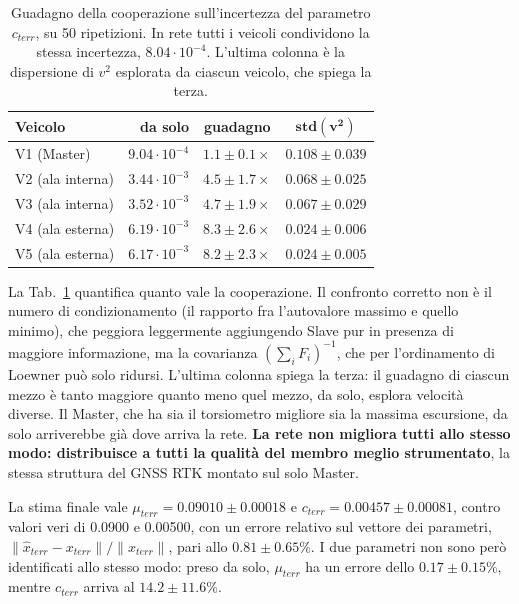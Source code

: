 \documentclass[conference,9pt]{IEEEtran}
\begin{document}
\begin{table}[t]
\centering
\caption{Guadagno della cooperazione sull'incertezza del parametro $c_{terr}$,
su 50 ripetizioni. In rete tutti i veicoli condividono la stessa incertezza,
$8.04\cdot10^{-4}$. L'ultima colonna \`e la dispersione di $v^2$ esplorata da
ciascun veicolo, che spiega la terza.}
\label{tab:dwls_gain}
\begin{tabular}{lrcc}
\toprule
\textbf{Veicolo} & \textbf{da solo} & \textbf{guadagno} & $\mathbf{std(v^2)}$\\
\midrule
V1 (Master)      & $9.04\cdot10^{-4}$ & $1.1 \pm 0.1\times$ & $0.108 \pm 0.039$\\
V2 (ala interna) & $3.44\cdot10^{-3}$ & $\mathbf{4.5 \pm 1.7\times}$ & $0.068 \pm 0.025$\\
V3 (ala interna) & $3.52\cdot10^{-3}$ & $\mathbf{4.7 \pm 1.9\times}$ & $0.067 \pm 0.029$\\
V4 (ala esterna) & $6.19\cdot10^{-3}$ & $\mathbf{8.3 \pm 2.6\times}$ & $0.024 \pm 0.006$\\
V5 (ala esterna) & $6.17\cdot10^{-3}$ & $\mathbf{8.2 \pm 2.3\times}$ & $0.024 \pm 0.005$\\
\bottomrule
\end{tabular}
\end{table}

La Tab.~\ref{tab:dwls_gain} quantifica quanto vale la cooperazione. Il
confronto corretto non \`e il numero di condizionamento (il rapporto fra l'autovalore
massimo e quello minimo), che peggiora
leggermente aggiungendo Slave pur in presenza di maggiore informazione, ma la
covarianza $(\sum_i F_i)^{-1}$, che per l'ordinamento di Loewner pu\`o solo
ridursi. L'ultima colonna spiega la terza: il guadagno di ciascun mezzo \`e
tanto maggiore quanto meno quel mezzo, da solo, esplora velocit\`a diverse. Il
Master, che ha sia il torsiometro migliore sia la massima escursione, da solo
arriverebbe gi\`a dove arriva la rete. \textbf{La rete non migliora tutti allo
stesso modo: distribuisce a tutti la qualit\`a del membro meglio strumentato},
la stessa struttura del GNSS RTK montato sul solo Master.

La
stima finale vale $\mu_{terr} = 0.09010 \pm 0.00018$ e
$c_{terr} = 0.00457 \pm 0.00081$, contro valori veri di 0.0900 e 0.00500, con un
errore relativo sul vettore dei parametri,
$\lVert \hat x_{terr} - x_{terr}\rVert / \lVert x_{terr} \rVert$, pari allo
$\mathbf{0.81 \pm 0.65\%}$. I due parametri non sono per\`o identificati allo
stesso modo: preso da solo, $\mu_{terr}$ ha un errore dello $0.17 \pm 0.15\%$,
mentre $c_{terr}$ arriva al $\mathbf{14.2 \pm 11.6\%}$.
\end{document}
